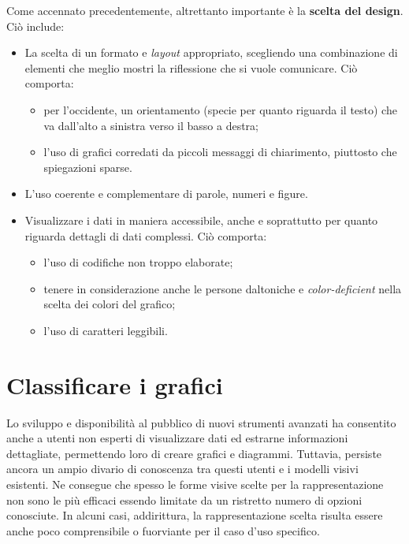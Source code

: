 \noindent Come accennato precedentemente, altrettanto importante è la \textbf{scelta del design}. Ciò include:
\begin{itemize}
    \item La scelta di un formato e \emph{layout} appropriato, scegliendo una combinazione di elementi che meglio mostri la riflessione che si vuole comunicare. Ciò comporta:
    \begin{itemize}
        \item per l'occidente, un orientamento (specie per quanto riguarda il testo) che va dall'alto a sinistra verso il basso a destra;
        \item l'uso di grafici corredati da piccoli messaggi di chiarimento, piuttosto che spiegazioni sparse.
    \end{itemize}
    \item L'uso coerente e complementare di parole, numeri e figure.
    \item Visualizzare i dati in maniera accessibile, anche e soprattutto per quanto riguarda dettagli di dati complessi. Ciò comporta:
    \begin{itemize}
        \item l'uso di codifiche non troppo elaborate;
        \item tenere in considerazione anche le persone daltoniche e \emph{color-deficient} nella scelta dei colori del grafico;
        \item l'uso di caratteri leggibili.
    \end{itemize}
\end{itemize}



\section{Classificare i grafici}\label{sec:classificare_grafici}
Lo sviluppo e disponibilità al pubblico di nuovi strumenti avanzati ha consentito anche a utenti non esperti di visualizzare dati ed estrarne informazioni dettagliate, 
permettendo loro di creare grafici e diagrammi.
Tuttavia, persiste ancora un ampio divario di conoscenza tra questi utenti e i modelli visivi esistenti.
Ne consegue che spesso le forme visive scelte per la rappresentazione non sono le più efficaci essendo limitate da un ristretto numero di opzioni conosciute.
In alcuni casi, addirittura, la rappresentazione scelta risulta essere anche poco comprensibile o fuorviante per il caso d'uso specifico.

